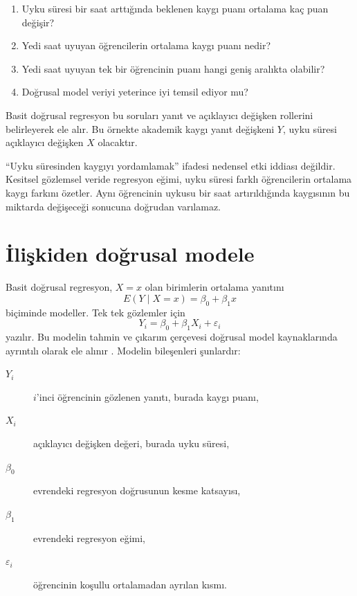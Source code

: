 \begin{enumerate}
  \item Uyku süresi bir saat arttığında beklenen kaygı puanı ortalama kaç puan değişir?
  \item Yedi saat uyuyan öğrencilerin ortalama kaygı puanı nedir?
  \item Yedi saat uyuyan tek bir öğrencinin puanı hangi geniş aralıkta olabilir?
  \item Doğrusal model veriyi yeterince iyi temsil ediyor mu?
\end{enumerate}


Basit doğrusal regresyon bu soruları yanıt ve açıklayıcı değişken rollerini
belirleyerek ele alır. Bu örnekte akademik kaygı yanıt değişkeni $Y$, uyku
süresi açıklayıcı değişken $X$ olacaktır.

\begin{researchbox}
``Uyku süresinden kaygıyı yordamlamak'' ifadesi nedensel etki iddiası değildir.
Kesitsel gözlemsel veride regresyon eğimi, uyku süresi farklı öğrencilerin
ortalama kaygı farkını özetler. Aynı öğrencinin uykusu bir saat artırıldığında
kaygısının bu miktarda değişeceği sonucuna doğrudan varılamaz.
\end{researchbox}

\section{İlişkiden doğrusal modele}

Basit doğrusal regresyon, $X=x$ olan birimlerin ortalama yanıtını
\[
E(Y\mid X=x)=\beta_0+\beta_1x
\]
biçiminde modeller. Tek tek gözlemler için
\[
Y_i=\beta_0+\beta_1X_i+\varepsilon_i
\]
yazılır. Bu modelin tahmin ve çıkarım çerçevesi doğrusal model kaynaklarında
ayrıntılı olarak ele alınır \cite{kutner2005}. Modelin bileşenleri şunlardır:

\begin{description}
  \item[$Y_i$] $i$'inci öğrencinin gözlenen yanıtı, burada kaygı puanı,
  \item[$X_i$] açıklayıcı değişken değeri, burada uyku süresi,
  \item[$\beta_0$] evrendeki regresyon doğrusunun kesme katsayısı,
  \item[$\beta_1$] evrendeki regresyon eğimi,
  \item[$\varepsilon_i$] öğrencinin koşullu ortalamadan ayrılan kısmı.
\end{description}

